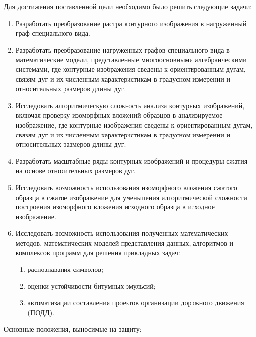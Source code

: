 \noindent
Для достижения поставленной цели необходимо было решить следующие задачи:	
\begin{enumerate}
	\item Разработать преобразование растра контурного изображения в нагруженный граф специального вида.
	\item Разработать преобразование нагруженных графов специального вида в математические модели, представленные многоосновными алгебраическими системами, где контурные изображения сведены к ориентированным дугам, связям дуг и их численным характеристикам в градусном измерении и  относительных размеров  длины дуг.
	\item Исследовать алгоритмическую сложность  анализа контурных изображений, включая проверку изоморфных вложений образцов в анализируемое изображение, где контурные изображения сведены к ориентированным дугам, связям дуг и их численным характеристикам в градусном измерении и  относительных размеров  длины дуг.
	\item Разработать  масштабные ряды контурных изображений и процедуры сжатия на  основе относительных размеров дуг.
	\item Исследовать возможность использования  изоморфного вложения сжатого образца в сжатое изображение для уменьшения алгоритмической сложности построения  изоморфного вложения исходного образца в исходное изображение.
	\item Исследовать возможность использования полученных математических методов, математических моделей представления данных, алгоритмов и комплексов программ для решения прикладных задач:
	\begin{enumerate}
		\item распознавания символов;
		\item оценки устойчивости битумных эмульсий;
		\item автоматизации составления проектов организации дорожного движения (ПОДД). 
	\end{enumerate}
\end{enumerate}
\noindent
Основные положения, выносимые на защиту:
